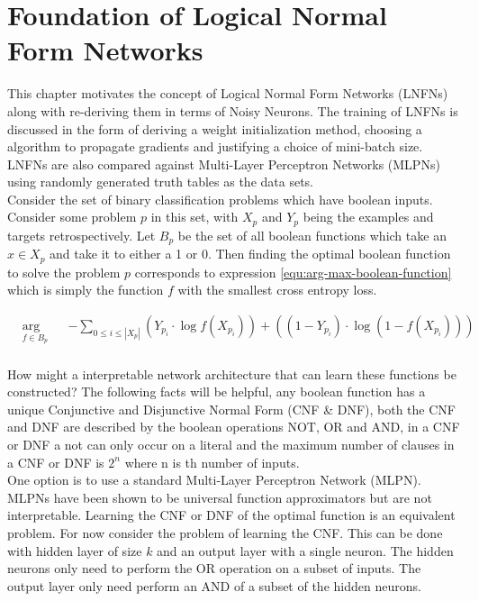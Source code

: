 \chapter{Foundation of Logical Normal Form Networks}\label{C:foundation-of-lnfns}
This chapter motivates the concept of Logical Normal Form Networks (LNFNs) along with re-deriving them in terms of Noisy Neurons. The training of LNFNs is discussed in the form of deriving a weight initialization method, choosing a algorithm to propagate gradients and justifying a choice of mini-batch size. LNFNs are also compared against Multi-Layer Perceptron Networks (MLPNs) using randomly generated truth tables as the data sets.\\

Consider the set of binary classification problems which have boolean inputs. Consider some problem $p$ in this set, with $X_p$ and $Y_p$ being the examples and targets retrospectively. Let $B_p$ be the set of all boolean functions which take an $x \in X_p$ and take it to either a 1 or 0. Then finding the optimal boolean function to solve the problem $p$ corresponds to expression \ref{equ:arg-max-boolean-function} which is simply the function $f$ with the smallest cross entropy loss.

\begin{equation}
\label{equ:arg-max-boolean-function}
\begin{aligned}
& \underset{f \in B_p}{\text{arg min}}
& & -\sum_{0 \leq i \leq |X_p|} (Y_{p_i} \cdot \log f(X_{p_i})) + ((1 - Y_{p_i}) \cdot \log(1 - f(X_{p_i})))  \\
\end{aligned}
\end{equation}

How might a interpretable network architecture that can learn these functions be constructed? The following facts will be helpful, any boolean function has a unique Conjunctive and Disjunctive Normal Form (CNF \& DNF), both the CNF and DNF are described by the boolean operations NOT, OR and AND, in a CNF or DNF a not can only occur on a literal and the maximum number of clauses in a CNF or DNF is $2^n$ where n is th number of inputs.\\

One option is to use a standard Multi-Layer Perceptron Network (MLPN). MLPNs have been shown to be universal function approximators but are not interpretable. Learning the CNF or DNF of the optimal function is an equivalent problem. For now consider the problem of learning the CNF. This can be done with hidden layer of size $k$ and an output layer with a single neuron. The hidden neurons only need to perform the OR operation on a subset of inputs. The output layer only need perform an AND of a subset of the hidden neurons.\\

